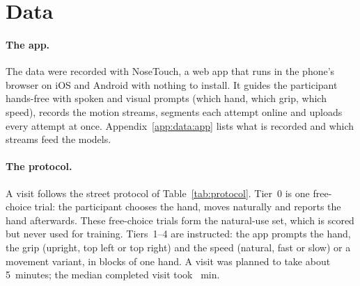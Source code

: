 \section{Data}\label{sec:data}

\paragraph{The app.} The data were recorded with NoseTouch, a web app that runs in the phone's browser on iOS and
Android with nothing to install. It guides the participant hands-free with spoken and visual prompts (which hand,
which grip, which speed), records the motion streams, segments each attempt online and uploads every attempt at
once. Appendix~\ref{app:data:app} lists what is recorded and which streams feed the models.

\paragraph{The protocol.} A visit follows the street protocol of Table~\ref{tab:protocol}. Tier~0 is one
free-choice trial: the participant chooses the hand, moves naturally and reports the hand afterwards. These
free-choice trials form the natural-use set, which is scored but never used for training. Tiers~1--4 are instructed:
the app prompts the hand, the grip (upright, top left or top right) and the speed (natural, fast or slow) or a
movement variant, in blocks of one hand. A visit was planned to take about 5~minutes; the median completed visit
took ~min.

